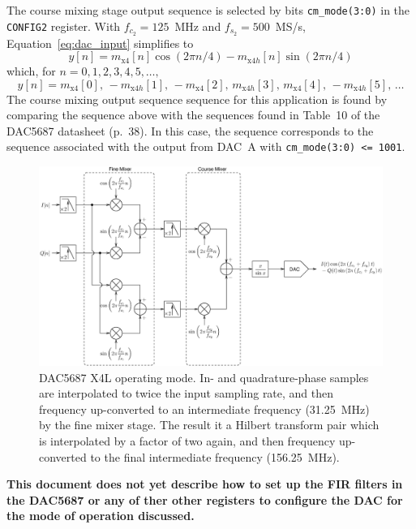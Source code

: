 \documentclass[12pt,letterpaper]{article}
\begin{document}
The course mixing stage output sequence is selected by
bits \texttt{cm\_mode(3:0)} in the \texttt{CONFIG2} register. With
$f_{c_2}=125$~MHz and $f_{s_2}=500$~MS/s, Equation~\ref{eq:dac_input}
simplifies to
\begin{equation}
  y[n] = m_\text{x4}[n]\cos\left(2\pi n/4\right)-m_{\text{x4}h}[n]\sin\left(2\pi n/4\right)
\end{equation}
which, for $n=0,1,2,3,4,5,\ldots,$
\begin{equation*}
  y[n]=m_\text{x4}[0],\,-m_{\text{x4}h}[1],\,-m_\text{x4}[2],\,m_{\text{x4}h}[3],\,m_\text{x4}[4],\,-m_{\text{x4}h}[5],\,\ldots
\end{equation*}
The course mixing output sequence sequence for this application is
found by comparing the sequence above with the sequences found in
Table~10 of the DAC5687 datasheet (p.~38). In this case, the sequence
corresponds to the sequence associated with the output from DAC~A with
\texttt{cm\_mode(3:0) <= 1001}.

\begin{figure}[htbp]
  \centering
  \includegraphics[scale=0.65]{dac5687-x4l.eps}
  \caption{DAC5687 X4L operating mode. In- and quadrature-phase
    samples are interpolated to twice the input sampling rate, and then
    frequency up-converted to an intermediate frequency (31.25~MHz) by
    the fine mixer stage. The result it a Hilbert transform pair which
    is interpolated by a factor of two again, and then frequency
    up-converted to the final intermediate frequency (156.25~MHz).}
  \label{fig:dac5687-x4l}
\end{figure}

\textbf{This document does not yet describe how to set up the FIR
filters in the DAC5687 or any of ther other registers to configure the
DAC for the mode of operation discussed.}
\end{document}
